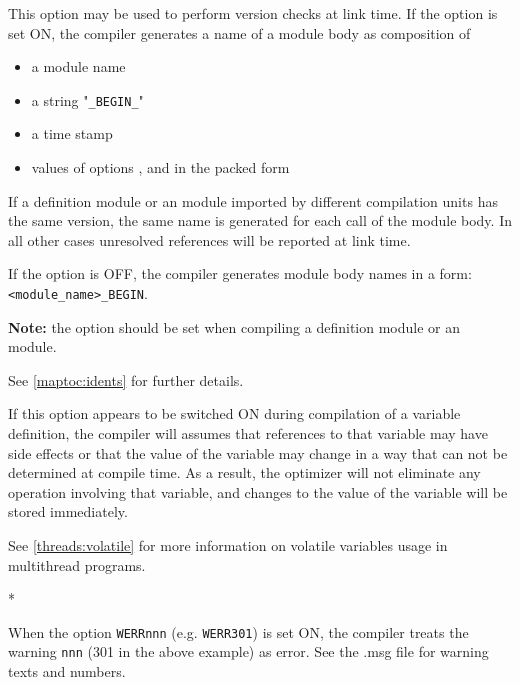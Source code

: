 \begin{description}
        This option may be used to perform version checks
        at link time. If the option is set ON, the compiler generates
        a name of a module body as composition of
        \begin{itemize}
        \item a module name
        \item a string "\verb+_BEGIN_+"
        \item a time stamp
\ifgenc
        \item values of options ,  and
         in the packed form
\fi
        \end{itemize}
        If a \mt{} definition module or an \ot{} module imported by
        different compilation units has the same version, the same
        name is generated for each call of the module body.
        In all other cases unresolved references will be reported
        at link time.

        If the option is OFF, the compiler generates module body names
        in a form: \verb|<module_name>_BEGIN|.

        {\bf Note:} the option should be set when compiling
        a \mt{} definition module or an \ot{} module.

\ifgenc
        See \ref{maptoc:idents} for further details.
\fi

\ifgencode
{}
        \MLBegin{}\ModeC{}\MLEnd{} \inline

        If this option appears to be switched ON during compilation
        of a variable definition, the compiler will assumes that references
        to that variable may have side effects or that the value of
        the variable may change in a way that can not be determined
        at compile time. As a result, the optimizer will not eliminate any
        operation involving that variable, and changes to the value of
        the variable will be stored immediately.

\ifthreads
        See \ref{threads:volatile} for more information on volatile
        variables usage in multithread programs.
\fi
\fi

        \MLBegin{}*\MLEnd{}  \inline

        When the option \verb'WERRnnn' (e.g. \verb'WERR301') is set ON, the
        compiler treats the warning \verb'nnn' (301 in the above example) as error.
        See the \XC{}.msg file for warning texts and numbers.


\end{description}
